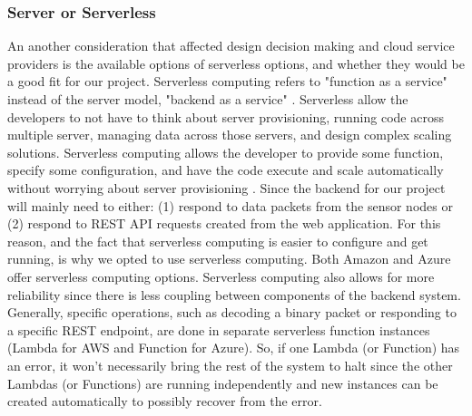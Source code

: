 \subsubsection{Server or Serverless}
An another consideration that affected design decision making and cloud service providers is the
available options of serverless options, and whether they would be a good fit for our project.
Serverless computing refers to "function as a service" instead of the server model, "backend as
a service" \cite{server-vs-serverless}. Serverless allow the developers to not have to think about
server provisioning, running code across multiple server, managing data across those servers, and
design complex scaling solutions. Serverless computing allows the developer to provide some
function, specify some configuration, and have the code execute and scale automatically without
worrying about server provisioning \cite{aws-serverless}. Since the backend for our project will
mainly need to either: (1) respond to data packets from the sensor nodes or (2) respond to REST API
requests created from the web application. For this reason, and the fact that serverless computing
is easier to configure and get running, is why we opted to use serverless computing. Both Amazon and
Azure offer serverless computing options. Serverless computing also allows for more reliability
since there is less coupling between components of the backend system. Generally, specific
operations, such as decoding a binary packet or responding to a specific REST endpoint, are done in
separate serverless function instances (Lambda for AWS and Function for Azure). So, if one Lambda
(or Function) has an error, it won't necessarily bring the rest of the system to halt since the
other Lambdas (or Functions) are running independently and new instances can be created
automatically to possibly recover from the error.


